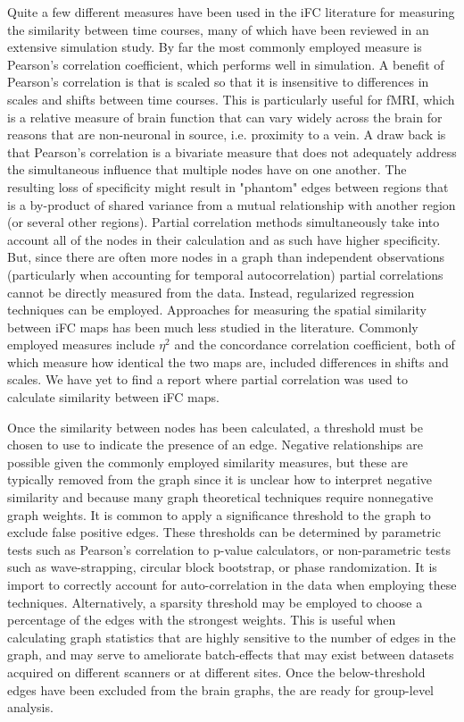 Quite a few different measures have been used in the iFC literature for measuring the similarity between time courses, many of which have been reviewed in an extensive simulation study\cite{smith2010}. By far the most commonly employed measure is Pearson's correlation coefficient, which performs well in simulation\cite{smith2010}. A benefit of Pearson's correlation is that is scaled so that it is insensitive to differences in scales and shifts between time courses. This is particularly useful for fMRI, which is a relative measure of brain function that can vary widely across the brain for reasons that are non-neuronal in source, i.e. proximity to a vein\cite{smithbook}. A draw back is that Pearson's correlation is a bivariate measure that does not adequately address the simultaneous influence that multiple nodes have on one another. The resulting loss of specificity might result in "phantom" edges between regions that is a by-product of shared variance from a mutual relationship with another region (or several other regions)\cite{VaroquauxCraddock2013}. Partial correlation methods simultaneously take into account all of the nodes in their calculation and as such have higher specificity. But, since there are often more nodes in a graph than independent observations (particularly when accounting for temporal autocorrelation) partial correlations cannot be directly measured from the data. Instead, regularized regression techniques can be employed\cite{VaroquauxCraddock2013}. Approaches for measuring the spatial similarity between iFC maps has been much less studied in the literature. Commonly employed measures include $\eta^2$\cite{} and the concordance correlation coefficient\cite{}, both of which measure how identical the two maps are, included differences in shifts and scales. We have yet to find a report where partial correlation was used to calculate similarity between iFC maps.

Once the similarity between nodes has been calculated, a threshold must be chosen to use to indicate the presence of an edge. Negative relationships are possible given the commonly employed similarity measures, but these are typically removed from the graph since it is unclear how to interpret negative similarity and because many graph theoretical techniques require nonnegative graph weights. It is common to apply a significance threshold to the graph to exclude false positive edges. These thresholds can be determined by parametric tests such as Pearson's correlation to p-value calculators, or non-parametric tests such as wave-strapping\cite{breakspear}, circular block bootstrap\cite{bellec}, or phase randomization\cite{zhen}. It is import to correctly account for auto-correlation in the data when employing these techniques. Alternatively, a sparsity threshold may be employed to choose a percentage of the edges with the strongest weights\cite{}. This is useful when calculating graph statistics that are highly sensitive to the number of edges in the graph, and may serve to ameliorate batch-effects that may exist between datasets acquired on different scanners or at different sites\cite{Chaogan}. Once the below-threshold edges have been excluded from the brain graphs, the are ready for group-level analysis. 

